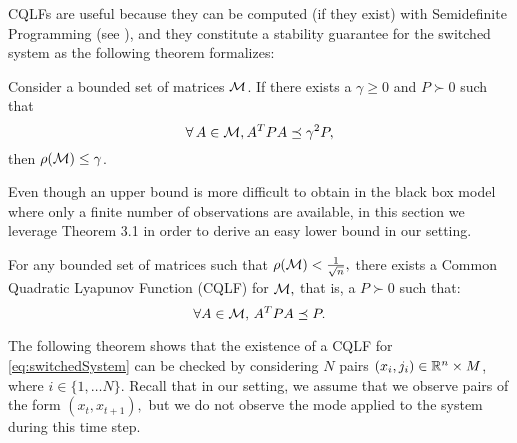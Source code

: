 CQLFs are useful because they can be computed (if they exist) with Semidefinite Programming (see \cite{boyd}), and they constitute a stability guarantee for the switched system as the following theorem formalizes:
\begin{theorem}\cite[Prop. 2.8]{jungers_lncis}\label{thm:cqlf} Consider a bounded set of matrices $\mathcal{M}$. If there exists a $\gamma \geq 0$ and $P \succ 0$ such that $$\forall\, A \in \mathcal{M}, A^TPA \preceq \gamma^2P,$$ then $\rho(\mathcal{M}) \leq \gamma$. 
\end{theorem}

Even though an upper bound is more difficult to obtain in the black box model where only a finite number of observations are available, in this section we leverage Theorem 3.1 in order to derive an easy lower bound in our setting.

\begin{theorem}\cite[Theorem 2.11]{jungers_lncis}\label{thm:john}
For any bounded set of matrices such that $\rho(\mathcal{M})<\frac{1}{\sqrt{n}},$ there exists a Common Quadratic Lyapunov Function (CQLF) for $\mathcal{M},$ that is, a $P\succ 0$ such that: $$\forall A\in \mathcal{M},\, A^TPA\preceq P. $$
\end{theorem}

The following theorem shows that the existence of a CQLF for \eqref{eq:switchedSystem} can be checked by considering $N$ pairs $(x_i, j_i) \in \mathbb{R}^n \times M$, where $i \in \{1, \ldots N\}.$ Recall that in our setting, we assume that we observe pairs of the form $(x_t,x_{t+1}),$ but we do not observe the mode applied to the system during this time step.
%

